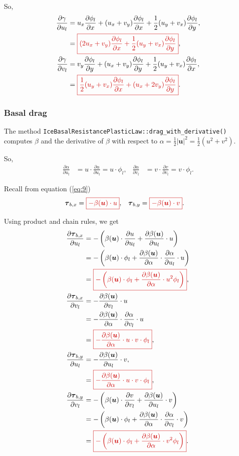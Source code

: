 \documentclass{amsart}
\newcommand{\diff}[2]{\ensuremath{\frac{\partial #1}{\partial #2}}}
\newcommand{\betaU}{\beta(\boldsymbol{u})}
\newcommand{\basalshearstress}[1]{\boldsymbol{\tau}_{b#1}}
\newcommand{\taubx}{\basalshearstress{,x}}
\newcommand{\tauby}{\basalshearstress{,y}}
\newcommand{\highlight}[1]{{\color{red!80!black} \fbox{$ \displaystyle #1 $} }}
\begin{document}
So,
\begin{align}
  \diff{\gamma}{u_l} &= u_x \diff{\phi_l}{x} + (u_x + v_y)\diff{\phi_l}{x} + \frac{1}{2} (u_y + v_x)\diff{\phi_l}{y},\notag\\
                     &= \highlight{ (2 u_x + v_y) \diff{\phi_l}{x} + \frac{1}{2} (u_y + v_x)\diff{\phi_l}{y} },\\
  \diff{\gamma}{v_l} &= v_y \diff{\phi_l}{y} + (u_x + v_y)\diff{\phi_l}{y} + \frac{1}{2} (u_y + v_x)\diff{\phi_l}{x},\notag\\
                     &= \highlight{ \frac{1}{2} (u_y + v_x)\diff{\phi_l}{x} + (u_x + 2 v_y)\diff{\phi_l}{y} }.
\end{align}


\subsubsection{Basal drag}
\label{sec:basal-drag}

The method \texttt{IceBasalResistancePlasticLaw::drag_with_derivative()} computes $\beta$ and the derivative of $\beta$ with respect to $\alpha = \frac12 |\boldsymbol{u}|^2 = \frac12 (u^2 + v^2)$.

So,
\begin{align*}
  \diff{\alpha}{u_l} &= u\cdot \diff{u}{u_l} = u\cdot \phi_l,&
  \diff{\alpha}{v_l} &= v\cdot \diff{v}{v_l} = v\cdot \phi_l.
\end{align*}

Recall from equation (\ref{eq:9})
\begin{align*}
  \taubx &=  \highlight{ - \betaU\cdot u }, &  \tauby &= \highlight{ - \betaU\cdot v }.
\end{align*}

Using product and chain rules, we get
\begin{align*}
  \diff{\taubx}{u_l} &= -\left(\betaU\cdot \diff{u}{u_l} + \diff{\betaU}{u_l}\cdot u\right)\\
                     &= -\left( \betaU\cdot \phi_l + \diff{\betaU}{\alpha}\cdot \diff{\alpha}{u_l}\cdot u \right)\\
                     &= \highlight{ -\left( \betaU\cdot \phi_l + \diff{\betaU}{\alpha}\cdot u^2 \phi_l \right) },\\
  \diff{\taubx}{v_l} &= -\diff{\betaU}{v_l}\cdot u\\
                     &= -\diff{\betaU}{\alpha}\cdot \diff{\alpha}{v_l}\cdot u\\
                     &= \highlight{ -\diff{\betaU}{\alpha}\cdot u\cdot v \cdot \phi_l },\\
  \diff{\tauby}{u_l} &= -\diff{\betaU}{u_l}\cdot v,\\
                     &= \highlight{ -\diff{\betaU}{\alpha}\cdot u\cdot v \cdot \phi_l },\\
  \diff{\tauby}{v_l} &= -\left( \betaU\cdot \diff{v}{v_l} + \diff{\betaU}{u_l}\cdot v \right)\\
                     &= -\left( \betaU\cdot \phi_l + \diff{\betaU}{\alpha}\cdot \diff{\alpha}{v_l}\cdot v \right)\\
                     &= \highlight{ -\left( \betaU\cdot \phi_l + \diff{\betaU}{\alpha}\cdot v^2 \phi_l \right) }.
\end{align*}
\end{document}
